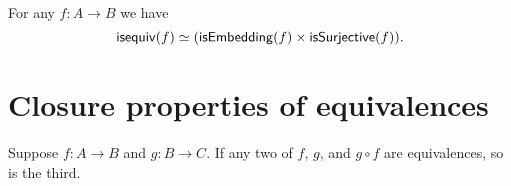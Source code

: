 \documentclass[hott-all.tex]{subfiles}
\begin{document}
\begin{cor}
  For any $f:A\to B$ we have
  \[ \mathsf{isequiv}(f) \simeq (\mathsf{isEmbedding}(f) \times \mathsf{isSurjective}(f)).\]
\end{cor}
%
%

\section{Closure properties of equivalences}
\label{sec:equiv-closures}
\label{sec:fiberwise-equivalences}
%



\begin{thm}\label{thm:two-out-of-three}
  Suppose $f:A\to B$ and $g:B\to C$.
  If any two of $f$, $g$, and $g\circ f$ are equivalences, so is the third.
\end{thm}
%
%
\end{document}

